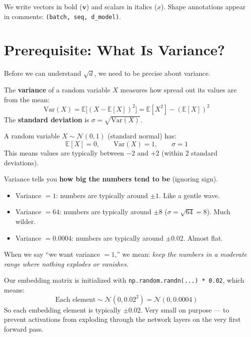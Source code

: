 \documentclass[11pt, a4paper]{article}
\begin{document}
\bigskip
\noindent We write vectors in bold ($\bm{v}$) and scalars in italics ($x$). Shape annotations
appear in comments: \texttt{(batch, seq, d\_model)}.


\section{Prerequisite: What Is Variance?}

Before we can understand $\sqrt{d}$, we need to be precise about variance.

\begin{formaldef}
The \textbf{variance} of a random variable $X$ measures how spread out its values are from the mean:
\[
\text{Var}(X) = \mathbb{E}\bigl[(X - \mathbb{E}[X])^2\bigr] = \mathbb{E}[X^2] - (\mathbb{E}[X])^2
\]
The \textbf{standard deviation} is $\sigma = \sqrt{\text{Var}(X)}$.

\medskip
\noindent A random variable $X \sim \mathcal{N}(0, 1)$ (standard normal) has:
\[
\mathbb{E}[X] = 0, \qquad \text{Var}(X) = 1, \qquad \sigma = 1
\]
This means values are typically between $-2$ and $+2$ (within 2 standard deviations).
\end{formaldef}

\begin{intuition}
Variance tells you \textbf{how big the numbers tend to be} (ignoring sign).

\begin{itemize}
\item Variance $= 1$: numbers are typically around $\pm 1$. Like a gentle wave.
\item Variance $= 64$: numbers are typically around $\pm 8$ ($\sigma = \sqrt{64} = 8$). Much wilder.
\item Variance $= 0.0004$: numbers are typically around $\pm 0.02$. Almost flat.
\end{itemize}

\noindent When we say ``we want variance $= 1$,'' we mean: \emph{keep the numbers in a moderate range
where nothing explodes or vanishes.}
\end{intuition}

\begin{application}
Our embedding matrix is initialized with \texttt{np.random.randn(...) * 0.02}, which means:
\[
\text{Each element} \sim \mathcal{N}(0, 0.02^2) = \mathcal{N}(0, 0.0004)
\]
So each embedding element is typically $\pm 0.02$. Very small on purpose --- to prevent
activations from exploding through the network layers on the very first forward pass.
\end{application}
\end{document}

